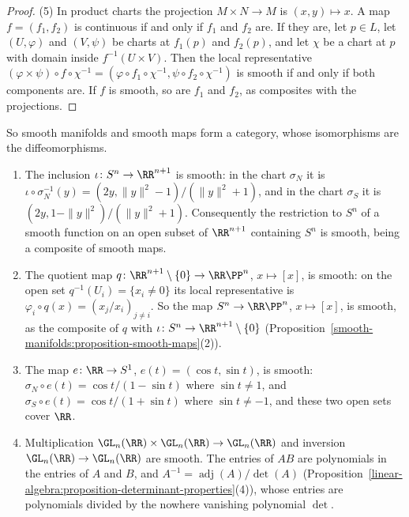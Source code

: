 \begin{proof}
(5) In product charts the projection $M \times N \to M$ is $(x, y) \mapsto x$. A map $f = (f_1, f_2)$ is continuous if and only if $f_1$ and $f_2$ are. If they
are, let $p \in L$, let $(U, \varphi)$ and $(V, \psi)$ be charts at $f_1(p)$ and $f_2(p)$, and let $\chi$ be a chart at $p$ with domain inside
$f^{-1}(U \times V)$. Then the local representative $(\varphi \times \psi) \circ f \circ \chi^{-1} = (\varphi \circ f_1 \circ \chi^{-1}, \psi \circ f_2 \circ \chi^{-1})$ is smooth if and
only if both components are. If $f$ is smooth, so are $f_1$ and $f_2$, as composites with the projections.
\end{proof}

So smooth manifolds and smooth maps form a category, whose isomorphisms are the diffeomorphisms.

\begin{example}\label{smooth-manifolds:example-smooth-maps}
\begin{enumerate}
\item The inclusion $\iota \colon S^n \to \RR^{n+1}$ is smooth: in the chart $\sigma_N$ it is
$\iota \circ \sigma_N^{-1}(y) = (2y, \|y\|^2 - 1)/(\|y\|^2 + 1)$, and in the chart $\sigma_S$ it is $(2y, 1 - \|y\|^2)/(\|y\|^2 + 1)$. Consequently the
restriction to $S^n$ of a smooth function on an open subset of $\RR^{n+1}$ containing $S^n$ is smooth, being a composite of smooth maps.
\item The quotient map $q \colon \RR^{n+1} \setminus \{0\} \to \RR\PP^n$, $x \mapsto [x]$, is smooth: on the open set $q^{-1}(U_i) = \{x_i \neq 0\}$ its local
representative is $\varphi_i \circ q(x) = (x_j/x_i)_{j \neq i}$. So the map $S^n \to \RR\PP^n$, $x \mapsto [x]$, is smooth, as the composite of $q$ with
$\iota \colon S^n \to \RR^{n+1} \setminus \{0\}$ (Proposition~\ref{smooth-manifolds:proposition-smooth-maps}(2)).
\item The map $e \colon \RR \to S^1$, $e(t) = (\cos t, \sin t)$, is smooth: $\sigma_N \circ e(t) = \cos t/(1 - \sin t)$ where $\sin t \neq 1$, and
$\sigma_S \circ e(t) = \cos t/(1 + \sin t)$ where $\sin t \neq -1$, and these two open sets cover $\RR$.
\item Multiplication $\GL_n(\RR) \times \GL_n(\RR) \to \GL_n(\RR)$ and inversion $\GL_n(\RR) \to \GL_n(\RR)$ are smooth. The entries of $AB$ are polynomials in
the entries of $A$ and $B$, and $A^{-1} = \operatorname{adj}(A)/\det(A)$ (Proposition~\ref{linear-algebra:proposition-determinant-properties}(4)), whose entries
are polynomials divided by the nowhere vanishing polynomial $\det$.
\end{enumerate}
\end{example}

